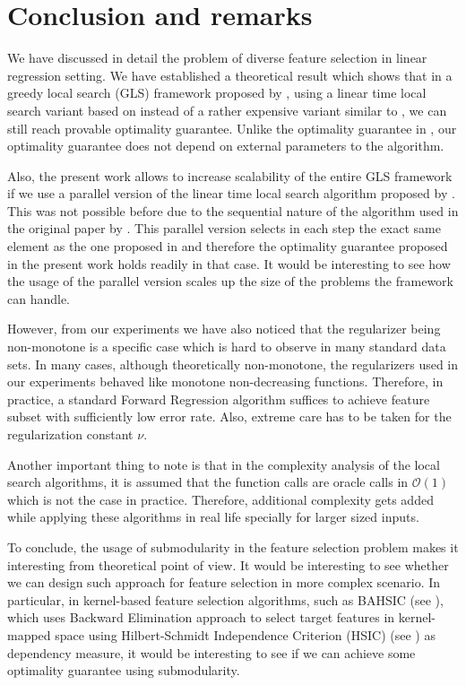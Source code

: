 \chapter{Conclusion and remarks}
\label{chapter:remarks}

We have discussed in detail the problem of diverse feature selection in linear regression setting. We have established a theoretical result which shows that in a greedy local search (GLS) framework proposed by \citealp{NIPS2012_4689}, using a linear time local search variant based on \citealp{Buchbinder:2012:TLT:2417500.2417835} instead of a rather expensive variant similar to \citealp{Feige:2011:MNS:2079073.2079078}, we can still reach provable optimality guarantee. Unlike the optimality guarantee in \citealp{NIPS2012_4689}, our optimality guarantee does not depend on external parameters to the algorithm.

Also, the present work allows to increase scalability of the entire GLS framework if we use a parallel version of the linear time local search algorithm proposed by \citealp{PanJGBJ14}. This was not possible before due to the sequential nature of the algorithm used in the original paper by \citealp{NIPS2012_4689}. This parallel version selects in each step the exact same element as the one proposed in \citealp{Buchbinder:2012:TLT:2417500.2417835} and therefore the optimality guarantee proposed in the present work holds readily in that case. It would be interesting to see how the usage of the parallel version scales up the size of the problems the framework can handle.

However, from our experiments we have also noticed that the regularizer being non-monotone is a specific case which is hard to observe in many standard data sets. In many cases, although theoretically non-monotone, the regularizers used in our experiments behaved like monotone non-decreasing functions. Therefore, in practice, a standard Forward Regression algorithm suffices to achieve feature subset with sufficiently low error rate. Also, extreme care has to be taken for the regularization constant $\nu$.

Another important thing to note is that in the complexity analysis of the local search algorithms, it is assumed that the function calls are oracle calls in $\mathcal{O}(1)$ which is not the case in practice. Therefore, additional complexity gets added while applying these algorithms in real life specially for larger sized inputs.

To conclude, the usage of submodularity in the feature selection problem makes it interesting from theoretical point of view. It would be interesting to see whether we can design such approach for feature selection in more complex scenario. In particular, in kernel-based feature selection algorithms, such as BAHSIC (see \citealp{SongBBGS07}), which uses Backward Elimination approach to select target features in kernel-mapped space using Hilbert-Schmidt Independence Criterion (HSIC) (see \citealp{Gretton:2005:MSD:2101372.2101382}) as dependency measure, it would be interesting to see if we can achieve some optimality guarantee using submodularity.